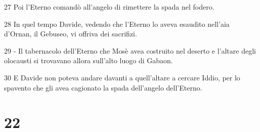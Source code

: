 \par 27 Poi l'Eterno comandò all'angelo di rimettere la spada nel fodero.
\par 28 In quel tempo Davide, vedendo che l'Eterno lo aveva esaudito nell'aia d'Ornan, il Gebuseo, vi offriva dei sacrifizi.
\par 29 - Il tabernacolo dell'Eterno che Mosè avea costruito nel deserto e l'altare degli olocausti si trovavano allora sull'alto luogo di Gabaon.
\par 30 E Davide non poteva andare davanti a quell'altare a cercare Iddio, per lo spavento che gli avea cagionato la spada dell'angelo dell'Eterno.

\chapter{22}


